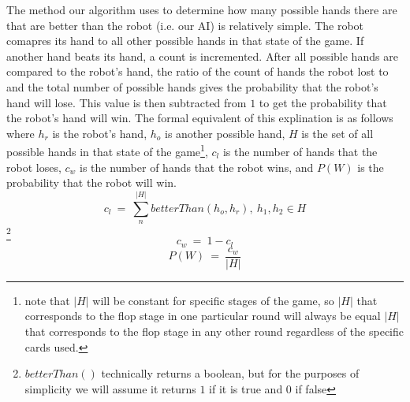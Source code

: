 \documentclass[10pt, a4paper, twocolumn]{article} %
\begin{document}
The method our algorithm uses to determine how many possible hands there are that are better than the robot (i.e. our AI) is relatively simple. The robot comapres its hand to all other possible hands in that state of the game. If another hand beats its hand, a count is incremented. After all possible hands are compared to the robot's hand, the ratio of the count of hands the robot lost to and the total number of possible hands gives the probability that the robot's hand will lose. This value is then subtracted from $1$ to get the probability that the robot's hand will win. The formal equivalent of this explination is as follows where $h_r$ is the robot's hand, $h_o$ is another possible hand, $H$ is the set of all possible hands in that state of the game\footnote{note that $|H|$ will be constant for specific stages of the game, so $|H|$ that corresponds to the flop stage in one particular round will always be equal $|H|$ that corresponds to the flop stage in any other round regardless of the specific cards used.}, $c_l$ is the number of hands that the robot loses, $c_w$ is the number of hands that the robot wins, and $P(W)$ is the probability that the robot will win.
$$c_l\ =\ \sum_n^{|H|}betterThan(h_o,h_r),\ h_1,h_2 \in H$$\footnote{$betterThan()$ technically returns a boolean, but for the purposes of simplicity we will assume it returns $1$ if it is true and $0$ if false}
$$c_w\ =\ 1 - c_l$$
$$P(W)\ =\ \frac{c_w}{|H|}$$
\end{document}
